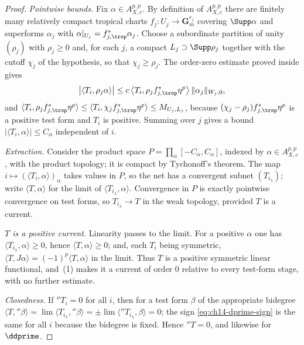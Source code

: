 \begin{proof}
\emph{Pointwise bounds.}  Fix $\alpha\in A_{X,c}^{p,p}$.  By definition of
$A_{X,c}^{p,p}$ there are finitely many relatively compact tropical charts
$f_j:U_j\to\mathbf G_m^{r_j}$ covering $\Supp\alpha$ and superforms
$\alpha_j$ with $\alpha|_{U_j}=f_{j,\trop}^*\alpha_j$.  Choose a subordinate
partition of unity $(\rho_j)$ with $\rho_j\ge0$ and, for each $j$, a compact
$L_j\supset\Supp\rho_j$ together with the cutoff $\chi_j$ of the hypothesis,
so that $\chi_j\ge\rho_j$.  The order-zero estimate proved inside
 gives
\[
 \bigl|\langle T_i,\rho_j\alpha\rangle\bigr|
 \le c\,\bigl\langle T_i,\rho_jf_{j,\trop}^*\eta^p\bigr\rangle\,
   \|\alpha_j\|_{W_j,0},
\]
and $\langle T_i,\rho_jf_{j,\trop}^*\eta^p\rangle
\le\langle T_i,\chi_jf_{j,\trop}^*\eta^p\rangle\le M_{U_j,L_j}$, because
$(\chi_j-\rho_j)f_{j,\trop}^*\eta^p$ is a positive test form and $T_i$ is
positive.  Summing over $j$ gives a bound
$|\langle T_i,\alpha\rangle|\le C_\alpha$ independent of $i$.

\emph{Extraction.}  Consider the product space
$P=\prod_{\alpha}[-C_\alpha,C_\alpha]$, indexed by
$\alpha\in A_{X,c}^{p,p}$, with the product topology; it is compact by
Tychonoff's theorem.  The map $i\mapsto(\langle T_i,\alpha\rangle)_\alpha$
takes values in $P$, so the net has a convergent subnet
$(T_{i_\lambda})$; write $\langle T,\alpha\rangle$ for the limit of
$\langle T_{i_\lambda},\alpha\rangle$.  Convergence in $P$ is exactly
pointwise convergence on test forms, so $T_{i_\lambda}\to T$ in the weak
topology, provided $T$ is a current.

\emph{$T$ is a positive current.}  Linearity passes to the limit.  For a
positive $\alpha$ one has $\langle T_{i_\lambda},\alpha\rangle\ge0$, hence
$\langle T,\alpha\rangle\ge0$; and, each $T_i$ being symmetric,
$\langle T,J\alpha\rangle=(-1)^p\langle T,\alpha\rangle$ in the limit.  Thus $T$ is a positive symmetric linear
functional, and \,(1) makes it a current
of order $0$ relative to every test-form stage, with no further estimate.

\emph{Closedness.}  If $\dprime T_i=0$ for all $i$, then for a test form
$\beta$ of the appropriate bidegree
$\langle T,\dprime\beta\rangle=\lim\langle T_{i_\lambda},\dprime\beta\rangle
=\pm\lim\langle\dprime T_{i_\lambda},\beta\rangle=0$; the sign
\eqref{eq:ch14-dprime-sign} is the same for all $i$ because the bidegree is
fixed.  Hence $\dprime T=0$, and likewise for $\ddprime$.
\end{proof}

